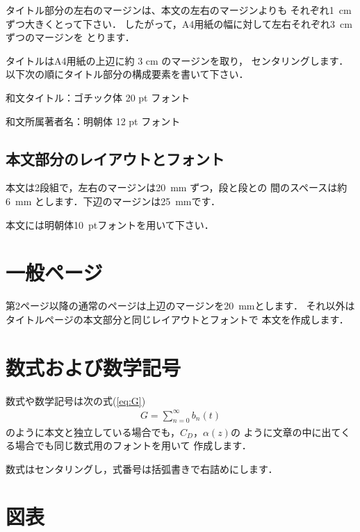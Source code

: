 \documentclass[a4j,10pt]{jsarticle}
\begin{document}
タイトル部分の左右のマージンは、本文の左右のマージンよりも
それぞれ1~cmずつ大きくとって下さい．
したがって，A4用紙の幅に対して左右それぞれ3~cmずつのマージンを
とります．

タイトルはA4用紙の上辺に約 3 cm のマージンを取り，
センタリングします．
以下次の順にタイトル部分の構成要素を書いて下さい．

和文タイトル：ゴチック体 20 pt フォント

和文所属著者名：明朝体 12 pt フォント

\subsection{本文部分のレイアウトとフォント}

本文は2段組で，左右のマージンは20~mm ずつ，段と段との
間のスペースは約6~mm とします．下辺のマージンは25~mmです．

本文には明朝体10~ptフォントを用いて下さい．

\section{一般ページ}

第2ページ以降の通常のページは上辺のマージンを20~mmとします．
それ以外はタイトルページの本文部分と同じレイアウトとフォントで
本文を作成します．

\section{数式および数学記号}
数式や数学記号は次の式(\ref{eq:G})
\begin{align}
  G = \sum_{n=0}^{\infty} b_n(t) \label{eq:G}
\end{align}
のように本文と独立している場合でも，$C_D$，$\alpha(z)$の
ように文章の中に出てくる場合でも同じ数式用のフォントを用いて
作成します．

数式はセンタリングし，式番号は括弧書きで右詰めにします．

\section{図表}
\end{document}
